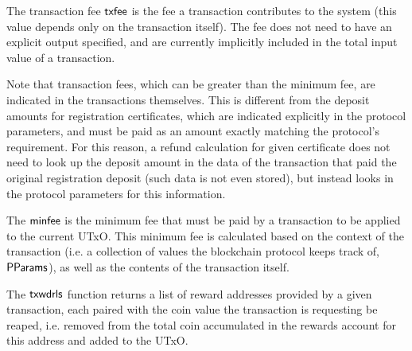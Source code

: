 \documentclass[11pt,a4paper,dvipsnames]{article}
\newcommand{\PParams}{\type{PParams}}
\theoremstyle{definition}
\theoremstyle{definition}
\begin{document}
The transaction fee $\mathsf{txfee}$ is the
fee a transaction contributes to the system (this value depends only on
the transaction itself). The fee does not need to have an explicit output
specified, and are currently implicitly included in the total input value of
a transaction.

Note that transaction fees, which can be greater than the minimum fee, are
indicated in the transactions themselves. This is different from
the deposit amounts for registration certificates, which are
indicated explicitly in the protocol parameters,
and must be paid as an amount exactly matching the protocol's requirement.
For this reason, a refund calculation for given certificate does not need to look up the deposit
amount in the data of the transaction
that paid the original registration deposit (such data is not even stored),
but instead looks in the protocol
parameters for this information.

The $\mathsf{minfee}$ is the minimum
fee that must be paid by a transaction to be applied to the current UTxO.
This minimum fee
is calculated based on the context of the transaction (i.e. a collection of
values the blockchain protocol keeps track of, $\PParams$), as well as
the contents of the transaction itself.

The $\mathsf{txwdrls}$ function returns a list of reward addresses provided by a
given transaction, each paired with the coin value the transaction is requesting
be reaped, i.e. removed from the total coin accumulated in the rewards
account for this address and added to the UTxO.
\end{document}
